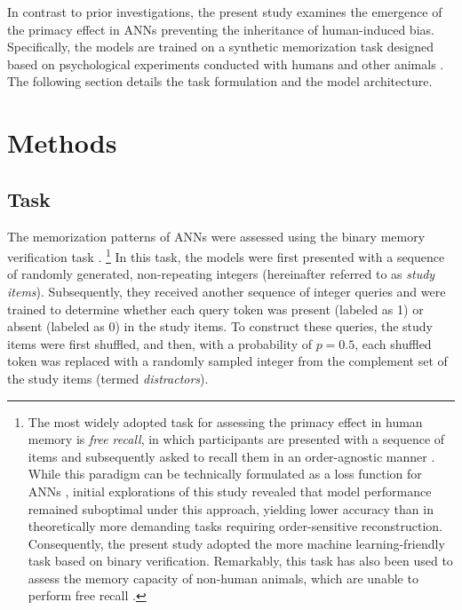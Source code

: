 \documentclass[10pt,letterpaper]{article}
\begin{document}
In contrast to prior investigations, the present study examines the emergence of the primacy effect in ANNs preventing the inheritance of human-induced bias.
Specifically, the models are trained on a synthetic memorization task designed based on psychological experiments conducted with humans and other animals \citep{ThompsonHerman77,SandsWright80,Wright+85}.
The following section details the task formulation and the model architecture.



\section{Methods}

\subsection{Task}

The memorization patterns of ANNs were assessed using the binary memory verification task \citep[Fig.~\ref{fig:task}; a.k.a. \emph{serial probe recognition};][]{WickelgrenNorman66,ThompsonHerman77,SandsWright80,Wright+85}.%
\footnote{
	The most widely adopted task for assessing the primacy effect in human memory is \emph{free recall}, in which participants are presented with a sequence of items and subsequently asked to recall them in an order-agnostic manner \citep{Murdock62,GlanzerCunitz66}. 
	While this paradigm can be technically formulated as a loss function for ANNs \citep{Cuturi13}, initial explorations of this study revealed that model performance remained suboptimal under this approach, yielding lower accuracy than in theoretically more demanding tasks requiring order-sensitive reconstruction.
	Consequently, the present study adopted the more machine learning-friendly task based on binary verification.
	Remarkably, this task has also been used to assess the memory capacity of non-human animals, which are unable to perform free recall \citep{ThompsonHerman77,SandsWright80,Wright+85}.
}
In this task, the models were first presented with a sequence of randomly generated, non-repeating integers (hereinafter referred to as \emph{study items}).
Subsequently, they received another sequence of integer queries and were trained to determine whether each query token was present (labeled as 1) or absent (labeled as 0) in the study items.
To construct these queries, the study items were first shuffled, and then, with a probability of $p=0.5$, each shuffled token was replaced with a randomly sampled integer from the complement set of the study items (termed \emph{distractors}).
\end{document}
